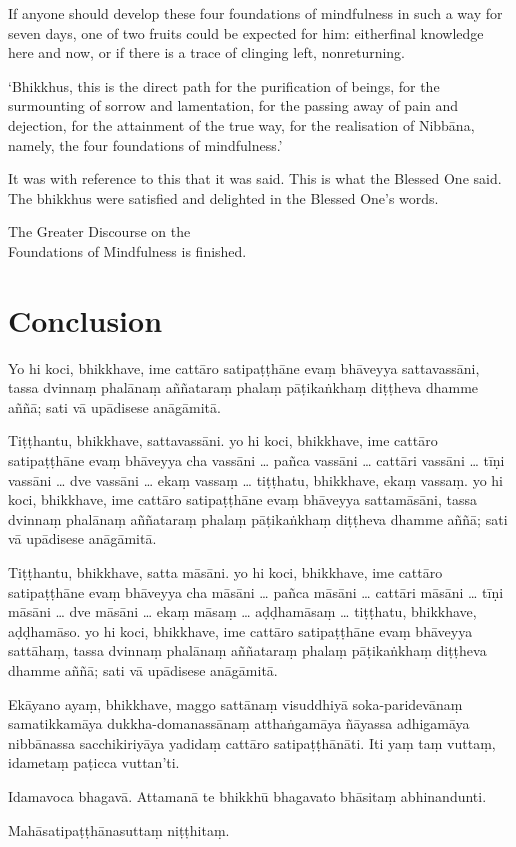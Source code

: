 If anyone should develop these four foundations of mindfulness in such a way
for seven days, one of two fruits could be expected for him: eitherfinal
knowledge here and now, or if there is a trace of clinging left, nonreturning.

`Bhikkhus, this is the direct path for the purification of beings, for the
surmounting of sorrow and lamentation, for the passing away of pain and
dejection, for the attainment of the true way, for the realisation of Nibbāna,
namely, the four foundations of mindfulness.'

It was with reference to this that it was said. This is what the Blessed One
said. The bhikkhus were satisfied and delighted in the Blessed One's words.

\bigskip

{\centering\instructionFont\color{instruction}\upshape

  The Greater Discourse on the\\
  Foundations of Mindfulness is finished.

}

\paliPage
\chapter*{Conclusion}

Yo hi koci, bhikkhave, ime cattāro satipaṭṭhāne evaṃ bhāveyya sattavassāni,
tassa dvinnaṃ phalānaṃ aññataraṃ phalaṃ pāṭikaṅkhaṃ diṭṭheva dhamme aññā; sati
vā upādisese anāgāmitā.

Tiṭṭhantu, bhikkhave, sattavassāni. yo hi koci, bhikkhave, ime cattāro
satipaṭṭhāne evaṃ bhāveyya cha vassāni \ldots{} pañca vassāni
\ldots{} cattāri vassāni \ldots{} tīṇi vassāni \ldots{} dve vassāni \ldots{}
ekaṃ vassaṃ \ldots{} tiṭṭhatu, bhikkhave, ekaṃ vassaṃ. yo hi koci, bhikkhave,
ime cattāro satipaṭṭhāne evaṃ bhāveyya sattamāsāni, tassa dvinnaṃ phalānaṃ
aññataraṃ phalaṃ pāṭikaṅkhaṃ diṭṭheva dhamme aññā; sati vā upādisese anāgāmitā.

Tiṭṭhantu, bhikkhave, satta māsāni. yo hi koci, bhikkhave, ime cattāro
satipaṭṭhāne evaṃ bhāveyya cha māsāni \ldots{} pañca māsāni \ldots{}
cattāri māsāni \ldots{} tīṇi māsāni \ldots{} dve māsāni \ldots{} ekaṃ māsaṃ
\ldots{} aḍḍhamāsaṃ \ldots{} tiṭṭhatu, bhikkhave, aḍḍhamāso. yo hi koci,
bhikkhave, ime cattāro satipaṭṭhāne evaṃ bhāveyya sattāhaṃ, tassa dvinnaṃ
phalānaṃ aññataraṃ phalaṃ pāṭikaṅkhaṃ diṭṭheva dhamme aññā; sati vā upādisese
anāgāmitā.

Ekāyano ayaṃ, bhikkhave, maggo sattānaṃ visuddhiyā soka-paridevānaṃ samatikkamāya
dukkha-domanassānaṃ atthaṅgamāya ñāyassa adhigamāya nibbānassa sacchikiriyāya
yadidaṃ cattāro satipaṭṭhānāti. Iti yaṃ taṃ vuttaṃ, idametaṃ paṭicca vuttan'ti.

Idamavoca bhagavā. Attamanā te bhikkhū bhagavato bhāsitaṃ abhinandunti.

\bigskip

{\centering\instructionFont\color{instruction}\upshape

  Mahāsatipaṭṭhānasuttaṃ niṭṭhitaṃ.

}

\resumeNormalText
